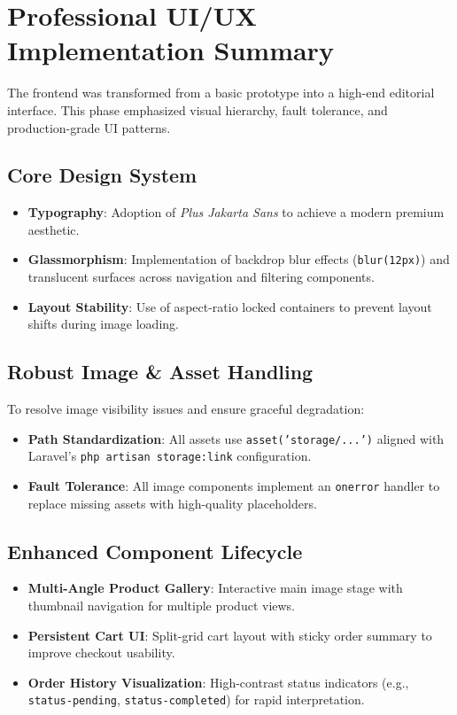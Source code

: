 \documentclass[12pt,a4paper]{article}
\begin{document}
\section{Professional UI/UX Implementation Summary}

The frontend was transformed from a basic prototype into a high-end editorial interface. This phase emphasized visual hierarchy, fault tolerance, and production-grade UI patterns.

\subsection{Core Design System}

\begin{itemize}
    \item \textbf{Typography}: Adoption of \textit{Plus Jakarta Sans} to achieve a modern premium aesthetic.
    \item \textbf{Glassmorphism}: Implementation of backdrop blur effects (\texttt{blur(12px)}) and translucent surfaces across navigation and filtering components.
    \item \textbf{Layout Stability}: Use of aspect-ratio locked containers to prevent layout shifts during image loading.
\end{itemize}

\subsection{Robust Image \& Asset Handling}

To resolve image visibility issues and ensure graceful degradation:

\begin{itemize}
    \item \textbf{Path Standardization}: All assets use \texttt{asset('storage/...')} aligned with Laravel’s \texttt{php artisan storage:link} configuration.
    
    \item \textbf{Fault Tolerance}: All image components implement an \texttt{onerror} handler to replace missing assets with high-quality placeholders.
\end{itemize}

\subsection{Enhanced Component Lifecycle}

\begin{itemize}
    \item \textbf{Multi-Angle Product Gallery}: Interactive main image stage with thumbnail navigation for multiple product views.
    
    \item \textbf{Persistent Cart UI}: Split-grid cart layout with sticky order summary to improve checkout usability.
    
    \item \textbf{Order History Visualization}: High-contrast status indicators (e.g., \texttt{status-pending}, \texttt{status-completed}) for rapid interpretation.
\end{itemize}
\end{document}
